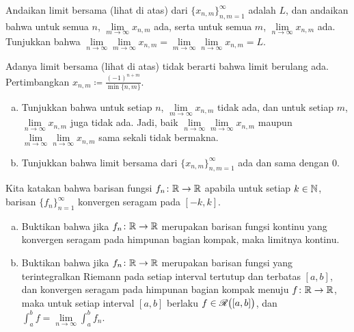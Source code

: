 \begin{exercise}
Andaikan limit bersama (lihat di atas) dari $\{ x_{n,m} \}_{n,m=1}^\infty$ adalah $L$, dan andaikan
bahwa untuk semua $n$, $\lim\limits_{m \to \infty} x_{n,m}$ ada,
serta untuk semua $m$, $\lim\limits_{n \to \infty} x_{n,m}$ ada.  Tunjukkan bahwa
$\lim\limits_{n\to\infty}\lim\limits_{m \to \infty} x_{n,m}
=
\lim\limits_{m\to\infty}\lim\limits_{n \to \infty} x_{n,m} = L$.
\end{exercise}

\begin{exercise}
Adanya limit bersama (lihat di atas) tidak berarti bahwa limit berulang ada.
Pertimbangkan $x_{n,m} \coloneqq \frac{{(-1)}^{n+m}}{\min \{n,m \}}$.
\begin{enumerate}[a)]
\item
Tunjukkan bahwa untuk setiap $n$,
$\lim\limits_{m \to \infty} x_{n,m}$ tidak ada, dan untuk setiap $m$,
$\lim\limits_{n \to \infty} x_{n,m}$ juga tidak ada.  Jadi, baik
$\lim\limits_{n\to\infty}\lim\limits_{m \to \infty} x_{n,m}$ maupun
$\lim\limits_{m\to\infty}\lim\limits_{n \to \infty} x_{n,m}$ sama sekali tidak
bermakna.
\item
Tunjukkan bahwa limit bersama dari $\{ x_{n,m} \}_{n,m=1}^\infty$ ada dan sama dengan 0.
\end{enumerate}
\end{exercise}

\begin{exercise}
Kita katakan bahwa barisan fungsi $f_n \colon {\mathbb{R}} \to {\mathbb{R}}$
\emph{}
apabila untuk setiap $k \in {\mathbb{N}}$,
barisan $\{ f_n \}_{n=1}^\infty$ konvergen seragam pada $[-k,k]$.
\begin{enumerate}[a)]
\item
Buktikan bahwa jika $f_n \colon {\mathbb{R}} \to {\mathbb{R}}$ merupakan barisan
fungsi kontinu yang konvergen seragam pada himpunan bagian kompak, maka
limitnya kontinu.
\item 
Buktikan bahwa jika $f_n \colon {\mathbb{R}} \to {\mathbb{R}}$ merupakan barisan
fungsi yang terintegralkan Riemann pada setiap interval tertutup dan terbatas $[a,b]$,
dan konvergen seragam pada himpunan bagian kompak menuju $f \colon {\mathbb{R}} \to {\mathbb{R}}$,
maka untuk setiap interval $[a,b]$ berlaku $f \in {\mathscr{R}}\bigl([a,b]\bigr)$, dan
$\int_a^b f = \lim\limits_{n\to\infty} \int_a^b f_n$.
\end{enumerate}
\end{exercise}

